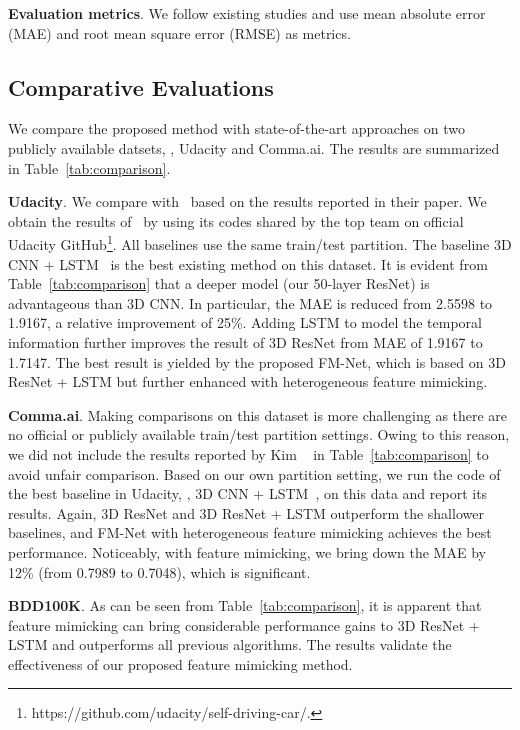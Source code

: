 \vspace{0.1cm}
\noindent\textbf{Evaluation metrics}. We follow existing studies and use mean absolute error (MAE) and root mean square error (RMSE) as metrics.



\subsection{Comparative Evaluations}
\label{exp:comparison}


We compare the proposed method with state-of-the-art approaches on two publicly available datsets, \ie, Udacity and Comma.ai. The results are summarized in Table~\ref{tab:comparison}.

\noindent
\textbf{Udacity}. We compare with~\cite{kim2017interpretable} based on the results reported in their paper. We obtain the results of~\cite{udacity} by using its codes shared by the top team on official Udacity GitHub\footnote{https://github.com/udacity/self-driving-car/.}. All baselines use the same train/test partition. The baseline 3D CNN + LSTM~\cite{udacity} is the best existing method on this dataset.
It is evident from Table~\ref{tab:comparison} that a deeper model (our 50-layer ResNet) is advantageous than 3D CNN. In particular, the MAE is reduced from 2.5598 to 1.9167, a relative improvement of 25\%.
Adding LSTM to model the temporal information further improves the result of 3D ResNet from MAE of 1.9167 to 1.7147.
The best result is yielded by the proposed FM-Net, which is based on 3D ResNet + LSTM but further enhanced with heterogeneous feature mimicking.

\noindent
\textbf{Comma.ai}. Making comparisons on this dataset is more challenging as there are no official or publicly available train/test partition settings. Owing to this reason, we did not include the results reported by Kim \etal~\cite{kim2017interpretable} in Table~\ref{tab:comparison} to avoid unfair comparison. Based on our own partition setting, we run the code of the best baseline in Udacity, \ie, 3D CNN + LSTM~\cite{udacity}, on this data and report its results. Again, 3D ResNet and 3D ResNet + LSTM outperform the shallower baselines, and FM-Net with heterogeneous feature mimicking achieves the best performance. Noticeably, with feature mimicking, we bring down the MAE by 12\% (from 0.7989 to 0.7048), which is significant.

\noindent
\textbf{BDD100K}. As can be seen from Table~\ref{tab:comparison}, it is apparent that feature mimicking can bring considerable performance gains to 3D ResNet + LSTM and outperforms all previous algorithms. The results validate the effectiveness of our proposed feature mimicking method.

